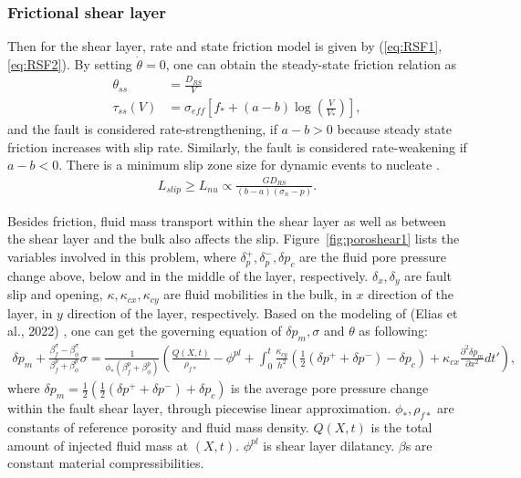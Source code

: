 \subsubsection{Frictional shear layer}
Then for the shear layer, 
rate and state friction model is given by (\ref{eq:RSF1}, \ref{eq:RSF2}). 
By setting $\dot{\theta} = 0$, 
one can obtain the steady-state friction relation as
\begin{align}
    \theta_{ss} &= \frac{D_{RS}}{V} \label{eq:thetaSS} \\
    \tau_{ss}(V) &= \sigma_{eff}\left[f_* + (a-b)\log\left(\frac{V}{V_*}\right) \right] \label{eq:RSss}, 
\end{align}
and the fault is considered rate-strengthening, 
if $a-b>0$ because steady state friction increases with slip rate. 
Similarly,
the fault is considered rate-weakening if $a-b<0$.
There is a minimum slip zone size for dynamic events to nucleate \cite{ruina_slip_1983}. 
\begin{align}
    L_{slip}\ge L_{nu} \propto \frac{GD_{RS}}{(b-a)(\sigma_n-p)} \label{eq:Lnu}.
\end{align}

Besides friction,
fluid mass transport within the shear layer as well as between the shear layer and the bulk also affects the slip. 
Figure~\ref{fig:poroshear1} lists the variables involved in this problem, 
where $\delta_p^+, \delta_p^-, \delta p_c$ are the fluid pore pressure change above, 
below and in the middle of the layer, 
respectively. 
$\delta_x, \delta_y$ are fault slip and opening, 
$\kappa, \kappa_{cx}, \kappa_{cy}$ are fluid mobilities in the bulk, 
in $x$ direction of the layer, 
in $y$ direction of the layer, 
respectively. 
Based on the modeling of (Elias et al., 2022) \cite{Elias_Shengduo_2022}, 
one can get the governing equation of $\delta p_m, \sigma$ and $\theta$ as following:
\begin{align}
    \delta p_m + \frac{\beta_f^\sigma - \beta_\phi^\sigma}{\beta_f^p+\beta^p_\phi}\sigma = \frac{1}{\phi_*(\beta_f^p+\beta^p_\phi)}\left(
    \frac{Q(X,t)}{\rho_{f*}}-\phi^{pl}+\int_0^t\frac{\kappa_{cy}}{h^2}\left(\frac{1}{2}(\delta p^+ + \delta p^-)- \delta p_c\right)+\kappa_{cx}\frac{\partial^2 \delta p_m}{\partial x^2} dt'
    \right) \label{eq:layerControl1}, 
\end{align}
where $\delta p_m =\frac{1}{2}\left(\frac{1}{2}(\delta p^++ \delta p^-)+\delta p_c\right)$
is the average pore pressure change within the fault shear layer, 
through piecewise linear approximation.
$\phi_*, \rho_{f*}$ are constants of reference porosity and fluid mass density.
$Q(X, t)$ is the total amount of injected fluid mass at $(X, t)$. 
$\phi^{pl}$ is shear layer dilatancy. 
$\beta$s are constant material compressibilities. 

